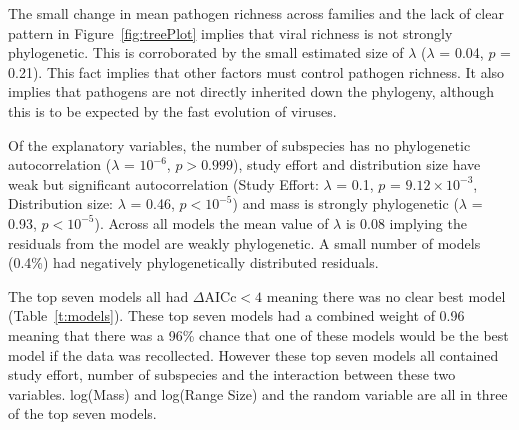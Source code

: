 The small change in mean pathogen richness across families and the lack of clear pattern in Figure~\ref{fig:treePlot} implies that viral richness is not strongly phylogenetic. 
This is corroborated by the small estimated size of $\lambda$ ($\lambda$ = 0.04, $p$ = 0.21).
This fact implies that other factors must control pathogen richness.
It also implies that pathogens are not directly inherited down the phylogeny, although this is to be expected by the fast evolution of viruses.

Of the explanatory variables, the number of subspecies has no phylogenetic autocorrelation ($\lambda$ = \ensuremath{10^{-6}}, $p > 0.999$), study effort and distribution size have weak but significant autocorrelation (Study Effort: $\lambda$ = 0.1, $p$ = \ensuremath{9.12\times 10^{-3}}, Distribution size: $\lambda$ = 0.46, $p < 10^{-5}$) and mass is strongly phylogenetic ($\lambda$ = 0.93, $p < 10^{-5}$). 
Across all models the mean value of $\lambda$ is 0.08 implying the residuals from the model are weakly phylogenetic.
A small number of models (0.4\%)  had negatively phylogenetically distributed residuals.


The top seven models all had $\Delta\text{AICc} < 4$ meaning there was no clear best model (Table~\ref{t:models}).
These top seven models had a combined weight of 0.96 meaning that there was a 96\% chance that one of these models would be the best model if the data was recollected.
However these top seven models all contained study effort, number of subspecies and the interaction between these two variables.
log(Mass) and log(Range Size) and the random variable are all in three of the top seven models.

